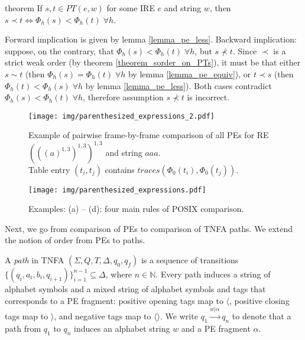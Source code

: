 \documentclass[AMA,STIX1COL]{WileyNJD-v2}
\newcommand{\Xl}{\langle}
\newcommand{\Xr}{\rangle}
\newcommand{\Xm}{\langle\!\rangle}
\newcommand{\YN}{\mathbb{N}}
\newcommand{\PT}{PT}
\begin{document}
\begin{theoremEnd}[restate, no link to proof, no link to theorem, category=theorem_order_on_pe_same_as_on_pt]{theorem}
    \label{theorem_order_on_pe_same_as_on_pt}
    If $s, t \in \PT(e, w)$ for some IRE $e$ and string $w$, then
    $s \prec t \Leftrightarrow \Phi_{h}(s) < \Phi_{h}(t) \; \forall h$.
\end{theoremEnd}
\begin{proofEnd}
    Forward implication is given by lemma \ref{lemma_pe_less}.
    Backward implication:
    suppose, on the contrary, that $\Phi_{h}(s) < \Phi_{h}(t) \; \forall h$, but $s \not\prec t$.
    Since $\prec$ is a strict weak order (by theorem \ref{theorem_sorder_on_PTs}),
    it must be that either $s \sim t$
    (then $\Phi_{h}(s) = \Phi_{h}(t) \; \forall h$ by lemma \ref{lemma_pe_equiv}),
    or $t \prec s$
    (then $\Phi_{h}(t) < \Phi_{h}(s) \; \forall h$ by lemma \ref{lemma_pe_less}).
    Both cases contradict $\Phi_{h}(s) < \Phi_{h}(t) \; \forall h$,
    therefore assumption $s \not\prec t$ is incorrect.
\end{proofEnd}

\begin{figure}[b!]
\texttt{[image: img/parenthesized\_expressions\_2.pdf]}
\vspace{-2em}
\caption{
Example of pairwise frame-by-frame comparison
of all PEs for RE $(((a)^{1,3})^{1,3})^{1,3}$ and string $aaa$.\\
Table entry $(t_i, t_j)$ contains $traces(\Phi_0(t_i), \Phi_0(t_j))$.
}\label{fig_pe2}
\end{figure}

\begin{figure}%
\texttt{[image: img/parenthesized\_expressions.pdf]}
\vspace{-2em}
\caption{
Examples: (a) -- (d): four main rules of POSIX comparison.
}\label{fig_pe}
\end{figure}


Next, we go from comparison of PEs to comparison of TNFA paths.
We extend the notion of order from PEs to paths.

    \begin{definition}[Path]
    A \emph{path} in TNFA $(\Sigma, Q, T, \Delta, q_0, q_f)$
    is a sequence of transitions $\{(q_i, a_i, b_i, q_{i + 1})\}_{i=1}^{n-1} \subseteq \Delta$, where $n \in \YN$.
    Every path induces a string of alphabet symbols
    and a mixed string of alphabet symbols and tags that corresponds to a PE fragment:
    positive opening tags map to $\Xl$,
    positive closing tags map to $\Xr$,
    and negative tags map to $\Xm$.
    We write $q_1 \overset {w|\alpha} {\longrightarrow} q_n$
    to denote that a path from $q_1$ to $q_n$ induces
    an alphabet string $w$
    and a PE fragment $\alpha$.
    \end{definition}
\end{document}
